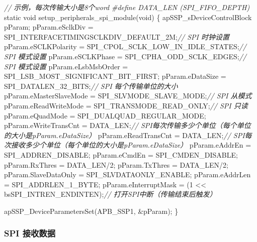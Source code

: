 \documentclass[
  12pt,
]{book}
\newenvironment{Shaded}{\begin{snugshade}}{\end{snugshade}}
\newcommand{\CommentTok}[1]{\textcolor[rgb]{0.56,0.35,0.01}{\textit{#1}}}
\newcommand{\DataTypeTok}[1]{\textcolor[rgb]{0.13,0.29,0.53}{#1}}
\newcommand{\DecValTok}[1]{\textcolor[rgb]{0.00,0.00,0.81}{#1}}
\newcommand{\NormalTok}[1]{#1}
\newcommand{\PreprocessorTok}[1]{\textcolor[rgb]{0.56,0.35,0.01}{\textit{#1}}}
\begin{document}
\begin{Shaded}
\begin{Highlighting}[]
\CommentTok{// 示例，每次传输大小是8个word}
\PreprocessorTok{#define DATA_LEN (SPI_FIFO_DEPTH)}
\DataTypeTok{static} \DataTypeTok{void}\NormalTok{ setup_peripherals_spi_module(}\DataTypeTok{void}\NormalTok{)}
\NormalTok{\{}
\NormalTok{    apSSP_sDeviceControlBlock pParam;}
\NormalTok{    pParam.eSclkDiv = SPI_INTERFACETIMINGSCLKDIV_DEFAULT_2M;}\CommentTok{// SPI 时钟设置}
\NormalTok{    pParam.eSCLKPolarity = SPI_CPOL_SCLK_LOW_IN_IDLE_STATES;}\CommentTok{// SPI 模式设置}
\NormalTok{    pParam.eSCLKPhase = SPI_CPHA_ODD_SCLK_EDGES;}\CommentTok{// SPI 模式设置}
\NormalTok{    pParam.eLsbMsbOrder = SPI_LSB_MOST_SIGNIFICANT_BIT_FIRST;}
\NormalTok{    pParam.eDataSize = SPI_DATALEN_32_BITS;}\CommentTok{// SPI 每个传输单位的大小}
\NormalTok{    pParam.eMasterSlaveMode = SPI_SLVMODE_SLAVE_MODE;}\CommentTok{// SPI 从模式}
\NormalTok{    pParam.eReadWriteMode = SPI_TRANSMODE_READ_ONLY;}\CommentTok{// SPI 只读}
\NormalTok{    pParam.eQuadMode = SPI_DUALQUAD_REGULAR_MODE;}
\NormalTok{    pParam.eWriteTransCnt = DATA_LEN;}\CommentTok{// SPI每次传输多少个单位（每个单位的大小是pParam.eDataSize）}
\NormalTok{    pParam.eReadTransCnt = DATA_LEN;}\CommentTok{// SPI每次接收多少个单位（每个单位的大小是pParam.eDataSize）}
\NormalTok{    pParam.eAddrEn = SPI_ADDREN_DISABLE;}
\NormalTok{    pParam.eCmdEn = SPI_CMDEN_DISABLE;}
\NormalTok{    pParam.RxThres = DATA_LEN/}\DecValTok{2}\NormalTok{;}
\NormalTok{    pParam.TxThres = DATA_LEN/}\DecValTok{2}\NormalTok{;}
\NormalTok{    pParam.SlaveDataOnly = SPI_SLVDATAONLY_ENABLE;}
\NormalTok{    pParam.eAddrLen = SPI_ADDRLEN_1_BYTE;}
\NormalTok{    pParam.eInterruptMask = (}\DecValTok{1}\NormalTok{ << bsSPI_INTREN_ENDINTEN);}\CommentTok{// 打开SPI中断（传输结束后触发）}
  
\NormalTok{    apSSP_DeviceParametersSet(APB_SSP1, &pParam);}
\NormalTok{\}}
\end{Highlighting}
\end{Shaded}

\hypertarget{spi-ux63a5ux6536ux6570ux636e}{%
\subsubsection{SPI 接收数据}\label{spi-ux63a5ux6536ux6570ux636e}}
\end{document}
